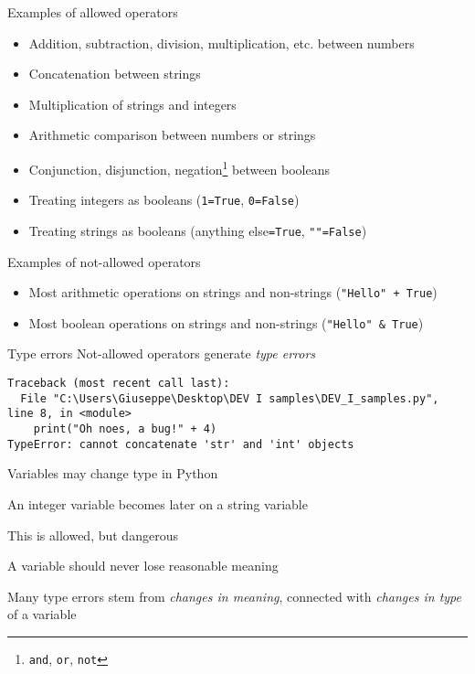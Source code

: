 \documentclass{beamer}
\begin{document}
\begin{slide}{
\item Examples of allowed operators
\begin{itemize}
\item Addition, subtraction, division, multiplication, etc. between numbers
\item Concatenation between strings
\item Multiplication of strings and integers
\item Arithmetic comparison between numbers or strings
\item Conjunction, disjunction, negation\footnote{\texttt{and}, \texttt{or}, \texttt{not}} between booleans
\item Treating integers as booleans (\texttt{1=True}, \texttt{0=False})
\item Treating strings as booleans (anything else\texttt{=True}, \texttt{""=False})
\end{itemize}
}\end{slide}

\begin{slide}{
\item Examples of not-allowed operators
\begin{itemize}
\item Most arithmetic operations on strings and non-strings (\texttt{"Hello" + True})
\item Most boolean operations on strings and non-strings (\texttt{"Hello" \& True})
\end{itemize}
}\end{slide}

\begin{frame}[fragile]{Type errors}
Not-allowed operators generate \textit{type errors}

\begin{lstlisting}[frame=shadowbox]
Traceback (most recent call last):
  File "C:\Users\Giuseppe\Desktop\DEV I samples\DEV_I_samples.py", line 8, in <module>
    print("Oh noes, a bug!" + 4)
TypeError: cannot concatenate 'str' and 'int' objects
\end{lstlisting}
\end{frame}

\begin{slide}{
\item Variables may change type in Python
\item An integer variable becomes later on a string variable
\item This is allowed, but dangerous
\item A variable should never lose reasonable meaning
\item Many type errors stem from \textit{changes in meaning}, connected with \textit{changes in type} of a variable
}\end{slide}
\end{document}
